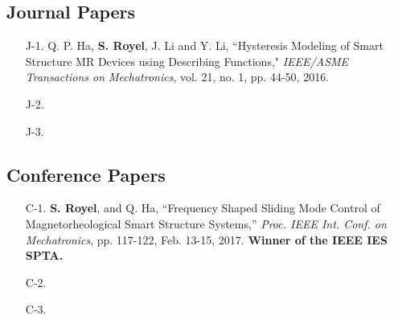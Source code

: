 \thispagestyle{empty}
\begin{publication}

\subsection*{Journal Papers}
\begin{enumerate}
  \itemsep0em 
  \item[J-1.] Q. P. Ha, \textbf{S. Royel}, J. Li and Y. Li, ``Hysteresis Modeling of Smart Structure MR Devices using Describing Functions," \emph{IEEE/ASME Transactions on Mechatronics}, vol. 21, no. 1, pp. 44-50, 2016.
  \item[J-2.] 
  \item[J-3.] 
\end{enumerate}

\subsection*{Conference Papers}
\begin{enumerate}
  \itemsep0em 
  \item[C-1.] \textbf{S. Royel}, and Q. Ha, ``Frequency Shaped Sliding Mode Control of Magnetorheological Smart Structure Systems,” \emph{Proc. IEEE Int. Conf. on Mechatronics}, pp. 117-122, Feb. 13-15, 2017. \textbf{Winner of the IEEE IES SPTA.} 
  \item[C-2.] 
  \item[C-3.] 
\end{enumerate}


\end{publication}
